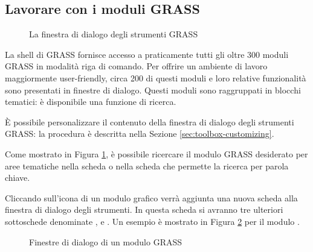 \subsection{Lavorare con i moduli GRASS}\label{subsec:grass_modules}

\begin{figure}[ht]
\centering
   \hspace{0.5cm}
\caption{La finestra di dialogo degli strumenti GRASS \nixcaption}\label{fig:grass_modules}
\end{figure}

La shell di GRASS fornisce accesso a praticamente tutti gli oltre 300 moduli GRASS 
in modalità riga di comando. Per offrire un ambiente di
lavoro maggiormente user-friendly, circa 200 di questi moduli e loro relative
funzionalità sono presentati in finestre di dialogo. Questi moduli sono
raggruppati in blocchi tematici: è disponibile una funzione di ricerca. 

È possibile personalizzare il contenuto della finestra di dialogo degli strumenti GRASS: la procedura 
è descritta nella Sezione \ref{sec:toolbox-customizing}.

Come mostrato in Figura \ref{fig:grass_modules}, è possibile ricercare il modulo
GRASS desiderato per aree tematiche nella scheda  o nella scheda  che permette la ricerca per parola chiave. 

Cliccando sull'icona di un modulo grafico verrà aggiunta una nuova scheda
alla finestra di dialogo degli strumenti. In questa scheda si avranno tre ulteriori
sottoschede denominate ,  e . Un
esempio è mostrato in Figura \ref{fig:grass_module_dialog} per il modulo
.

\begin{figure}[h]
\centering
   \hspace{1cm}
   \hspace{1cm}
\caption{Finestre di dialogo di un modulo GRASS \nixcaption}\label{fig:grass_module_dialog}
\end{figure}
\FloatBarrier

